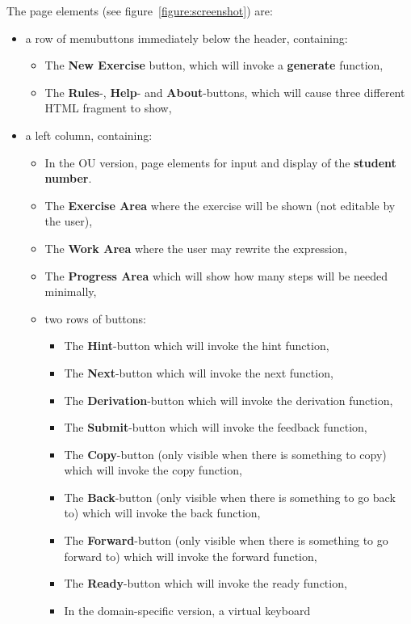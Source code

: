 \documentclass{article}
\begin{document}
The page elements (see figure~\ref{figure:screenshot}) are:
\begin{itemize}
\item a row of menubuttons immediately below the header, containing:
	\begin{itemize}
	\item The \textbf{New Exercise} button, which will invoke a \textbf{generate} function,
	\item The \textbf{Rules}-, \textbf{Help}- and \textbf{About}-buttons, which will cause three different HTML fragment to show,
		\end{itemize}
\item a left column, containing:
	\begin{itemize}
	\item In the OU version, page elements for input and display of the \textbf{student number}.
	\item The \textbf{Exercise Area} where the exercise will be shown (not editable by the user),
	\item The \textbf{Work Area} where the user may rewrite the expression,
	\item The \textbf{Progress Area} which will show how many steps will be needed minimally,
	\item two rows of buttons:
		\begin{itemize}
		\item The \textbf{Hint}-button which will invoke the hint function,
		\item The \textbf{Next}-button which will invoke the next function,
		\item The \textbf{Derivation}-button which will invoke the derivation function,
		\item The \textbf{Submit}-button which will invoke the feedback function,
		\item The \textbf{Copy}-button (only visible when there is something to copy) which will invoke the copy function,
		\item The \textbf{Back}-button (only visible when there is something to go back to) which will invoke the back function,
		\item The \textbf{Forward}-button (only visible when there is something to go forward to) which will invoke the forward function,
		\item The \textbf{Ready}-button which will invoke the ready function,
		\item In the domain-specific version, a virtual keyboard
		\end{itemize}

\end{itemize}
\end{itemize}
\end{document}

